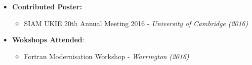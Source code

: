 \documentclass[11pt,a4paper,sans]{moderncv}        %
\begin{document}
\begin{itemize}
\vspace{6pt}

\item{\textbf{Contributed Poster:}
\begin{itemize}
\vspace{3pt}
\item SIAM UKIE 20th Annual Meeting 2016 - \textit{University of Cambridge (2016)}
\end{itemize}}

\vspace{6pt}

\item{\textbf{Wokshops Attended}:
\begin{itemize}
\vspace{3pt}
\item Fortran Modernisation Workshop - \textit{Warrington (2016)}
\vspace{3pt}
\end{itemize}}

\vspace{6pt}

\end{itemize}


\end{document}
